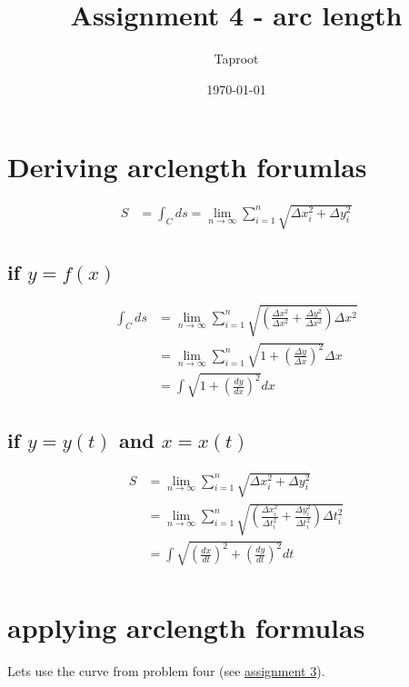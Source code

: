 \documentclass[letterpaper]{article}
\author{Taproot}
\date{\today}
\title{Assignment 4 - arc length}
\renewcommand{\tableofcontents}{}
\begin{document}
\tableofcontents

\setcounter{section}{5}
\section{Deriving arclength forumlas}
\label{sec:org0833668}

\[\begin{aligned}
  S &=  \int_{C}^{}  ds = \lim_{n \to  \infty}  \sum_{i=1}^{n} \sqrt{\Delta x_i^2 + \Delta y_i^2} 
  \end{aligned}\]

\subsection{if \(y = f(x)\)}
\label{sec:orgce74f9d}

\[\begin{aligned}
    \int_{C}^{}  ds &= \lim_{n\to \infty}  \sum_{i=1}^{n} \sqrt{\left(\frac{\Delta x^2}{\Delta x^2} + \frac{\Delta y^2}{\Delta x^2}\right)\Delta x^2}\\
    &= \lim_{n\to \infty}  \sum_{i=1}^{n} \sqrt{1 + \left(\frac{\Delta y}{\Delta x}\right)^2} \Delta x\\
    &= \int \sqrt{1 + \left(\frac{dy}{dx}\right)^2} dx 
   \end{aligned}\]


\subsection{if \(y = y(t)\) and \(x = x(t)\)}
\label{sec:org64edc94}



\[\begin{aligned}
  S &= \lim_{n \to  \infty}  \sum_{i=1}^{n} \sqrt{\Delta x_i^2 + \Delta y_i^2} \\
  &= \lim_{n \to  \infty}  \sum_{i=1}^{n} \sqrt{\left(\frac{\Delta x_i^2}{\Delta t_i^2} + \frac{\Delta y_i^2}{\Delta t_i^2}\right)\Delta t_i^2} \\
  &= \int \sqrt{\left(\frac{dx}{dt}\right)^2 + \left(\frac{dy}{dt}\right)^2} dt \\
   \end{aligned}\]

\section{applying arclength formulas}
\label{sec:orgdafb653}

Lets use the curve from problem four (see \href{KBe21math520retAssign3.org}{assignment 3}).
\end{document}
